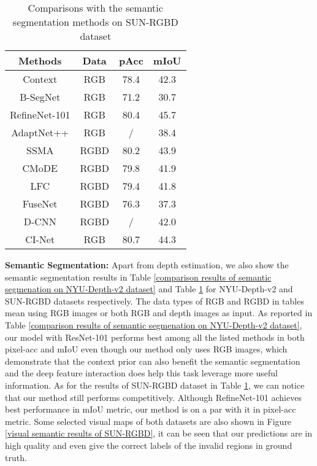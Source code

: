 \documentclass[sn-mathphys]{sn-jnl}
\theoremstyle{thmstyleone}\newtheorem{theorem}{Theorem}\newtheorem{proposition}[theorem]{Proposition}
\theoremstyle{thmstyletwo}\newtheorem{example}{Example}\newtheorem{remark}{Remark}
\theoremstyle{thmstylethree}\newtheorem{definition}{Definition}\usepackage[numbers,sort&compress]{natbib}
\begin{document}
\begin{table}[htbp]
	\centering
	\caption{Comparisons with the semantic segmentation methods on SUN-RGBD dataset}
	\begin{tabular}{c|c|cc}
		\toprule
		\textbf{Methods} & \textbf{Data} & pAcc & mIoU \\
		\hline
		\hline
		Context \cite{Lin_2016} & RGB & 78.4 & 42.3 \\
		B-SegNet \cite{kendall2015bayesian} & RGB & 71.2 & 30.7 \\
		RefineNet-101 \cite{Lin_2017} & RGB & 80.4 & 45.7 \\
		AdaptNet++ \cite{Valada_2019} & RGB & / & 38.4 \\
		SSMA \cite{Valada_2019} & RGBD & 80.2 & 43.9 \\
		CMoDE \cite{Valada_2017_Deep} & RGBD & 79.8 & 41.9 \\
		LFC \cite{Valada_2017} & RGBD & 79.4 & 41.8 \\
		FuseNet \cite{Hazirbas_2017} & RGBD & 76.3 & 37.3 \\
		D-CNN \cite{Wang_2018_Depth} & RGBD & / & 42.0 \\
		\hline
		\hline
		CI-Net & RGB & 80.7 & 44.3 \\ 
		\bottomrule
	\end{tabular}
	\label{comparison results of semantic segmenation on SUN-RGBD dataset}
\end{table}

\textbf{Semantic Segmentation:} Apart from depth estimation, we also show the semantic segmentation results in Table \ref{comparison results of semantic segmenation on NYU-Depth-v2 dataset} and Table \ref{comparison results of semantic segmenation on SUN-RGBD dataset} for NYU-Depth-v2 and SUN-RGBD datasets respectively. The data types of RGB and RGBD in tables mean using RGB images or both RGB and depth images as input. As reported in Table \ref{comparison results of semantic segmenation on NYU-Depth-v2 dataset}, our model with ResNet-101 performs best among all the listed methods in both pixel-acc and mIoU even though our method only uses RGB images, which demonstrate that the context prior can also benefit the semantic segmentation and the deep feature interaction does help this task leverage more useful information. As for the results of SUN-RGBD dataset in Table \ref{comparison results of semantic segmenation on SUN-RGBD dataset}, we can notice that our method still performs competitively. Although RefineNet-101 achieves best performance in mIoU metric, our method is on a par with it in pixel-acc metric. Some selected  visual maps of both datasets are also shown in Figure \ref{visual semantic results of SUN-RGBD}, it can be seen that our predictions are in high quality and even give the correct labels of the invalid regions in ground truth.
\end{document}
